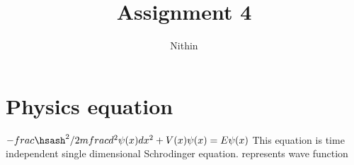 
\title{Assignment 4}
\author{Nithin}
\maketitle
\section{Physics equation}
 $-frac{\hsash^2}/{2m}frac{d^2\psi(x)}{dx^2}+V(x)\psi(x)=E\psi(x)$
 This equation is time independent single dimensional Schrodinger equation. \psi represents wave function

